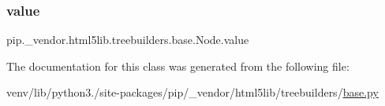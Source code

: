 \subsubsection{\texorpdfstring{value}{value}}
{\footnotesize\ttfamily pip.\+\_\+vendor.\+html5lib.\+treebuilders.\+base.\+Node.\+value}



The documentation for this class was generated from the following file\+:\begin{DoxyCompactItemize}
\item 
venv/lib/python3./site-\/packages/pip/\+\_\+vendor/html5lib/treebuilders/\hyperlink{__vendor_2html5lib_2treebuilders_2base_8py}{base.\+py}\end{DoxyCompactItemize}
